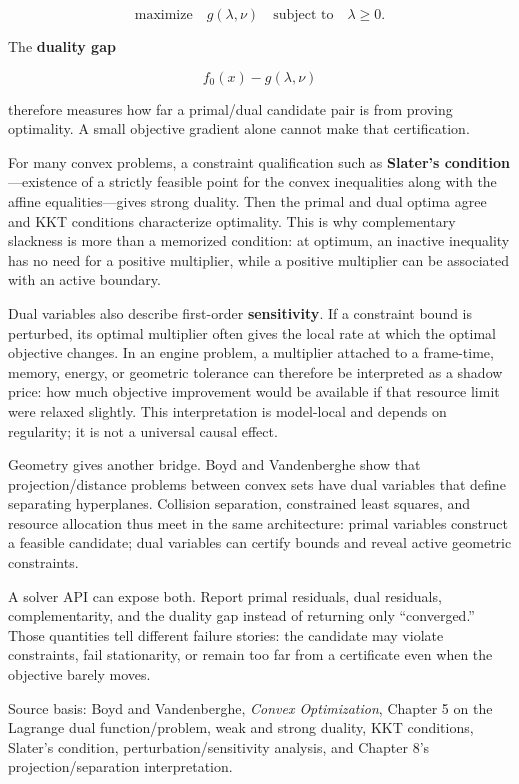 \[
\text{maximize}\quad g(\lambda,\nu)
\quad
\text{subject to}\quad \lambda\ge0.
\]

The \textbf{duality gap}

\[
f_0(x)-g(\lambda,\nu)
\]

therefore measures how far a primal/dual candidate pair is from proving optimality. A small objective gradient alone cannot make that certification.

For many convex problems, a constraint qualification such as \textbf{Slater's condition}---existence of a strictly feasible point for the convex inequalities along with the affine equalities---gives strong duality. Then the primal and dual optima agree and KKT conditions characterize optimality. This is why complementary slackness is more than a memorized condition: at optimum, an inactive inequality has no need for a positive multiplier, while a positive multiplier can be associated with an active boundary.

Dual variables also describe first-order \textbf{sensitivity}. If a constraint bound is perturbed, its optimal multiplier often gives the local rate at which the optimal objective changes. In an engine problem, a multiplier attached to a frame-time, memory, energy, or geometric tolerance can therefore be interpreted as a shadow price: how much objective improvement would be available if that resource limit were relaxed slightly. This interpretation is model-local and depends on regularity; it is not a universal causal effect.

Geometry gives another bridge. Boyd and Vandenberghe show that projection/distance problems between convex sets have dual variables that define separating hyperplanes. Collision separation, constrained least squares, and resource allocation thus meet in the same architecture: primal variables construct a feasible candidate; dual variables can certify bounds and reveal active geometric constraints.

A solver API can expose both. Report primal residuals, dual residuals, complementarity, and the duality gap instead of returning only ``converged.'' Those quantities tell different failure stories: the candidate may violate constraints, fail stationarity, or remain too far from a certificate even when the objective barely moves.

Source basis: Boyd and Vandenberghe, \emph{Convex Optimization}, Chapter 5 on the Lagrange dual function/problem, weak and strong duality, KKT conditions, Slater's condition, perturbation/sensitivity analysis, and Chapter 8's projection/separation interpretation.

